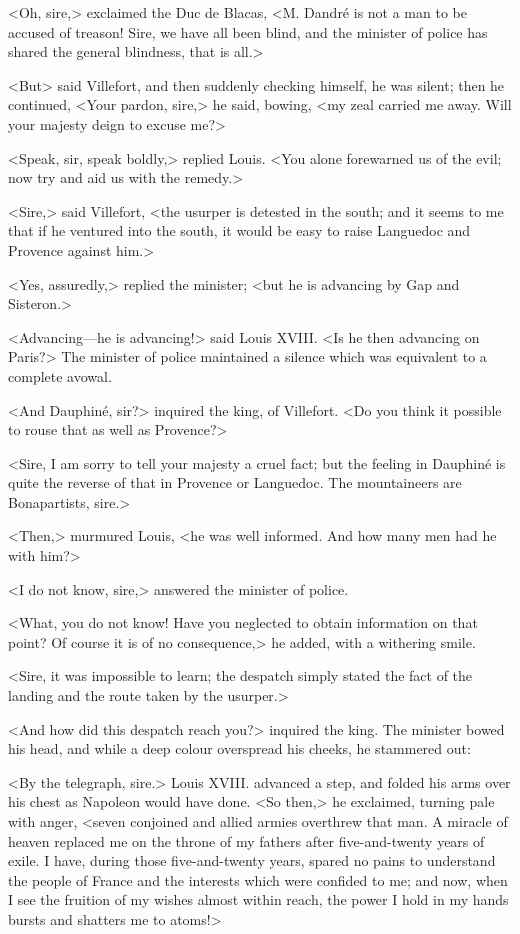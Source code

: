  <Oh, sire,> exclaimed the Duc de Blacas, <M. Dandré is not a man to be accused of treason! Sire, we have all been blind, and the minister of police has shared the general blindness, that is all.> 

 <But\longdash> said Villefort, and then suddenly checking himself, he was silent; then he continued, <Your pardon, sire,> he said, bowing, <my zeal carried me away. Will your majesty deign to excuse me?> 

 <Speak, sir, speak boldly,> replied Louis. <You alone forewarned us of the evil; now try and aid us with the remedy.> 

 <Sire,> said Villefort, <the usurper is detested in the south; and it seems to me that if he ventured into the south, it would be easy to raise Languedoc and Provence against him.> 

 <Yes, assuredly,> replied the minister; <but he is advancing by Gap and Sisteron.> 

 <Advancing—he is advancing!> said Louis XVIII. <Is he then advancing on Paris?> The minister of police maintained a silence which was equivalent to a complete avowal. 

 <And Dauphiné, sir?> inquired the king, of Villefort. <Do you think it possible to rouse that as well as Provence?> 

 <Sire, I am sorry to tell your majesty a cruel fact; but the feeling in Dauphiné is quite the reverse of that in Provence or Languedoc. The mountaineers are Bonapartists, sire.> 

 <Then,> murmured Louis, <he was well informed. And how many men had he with him?> 

 <I do not know, sire,> answered the minister of police. 

 <What, you do not know! Have you neglected to obtain information on that point? Of course it is of no consequence,> he added, with a withering smile. 

 <Sire, it was impossible to learn; the despatch simply stated the fact of the landing and the route taken by the usurper.> 

 <And how did this despatch reach you?> inquired the king. The minister bowed his head, and while a deep colour overspread his cheeks, he stammered out: 

 <By the telegraph, sire.> Louis XVIII. advanced a step, and folded his arms over his chest as Napoleon would have done.  <So then,> he exclaimed, turning pale with anger, <seven conjoined and allied armies overthrew that man. A miracle of heaven replaced me on the throne of my fathers after five-and-twenty years of exile. I have, during those five-and-twenty years, spared no pains to understand the people of France and the interests which were confided to me; and now, when I see the fruition of my wishes almost within reach, the power I hold in my hands bursts and shatters me to atoms!> 

